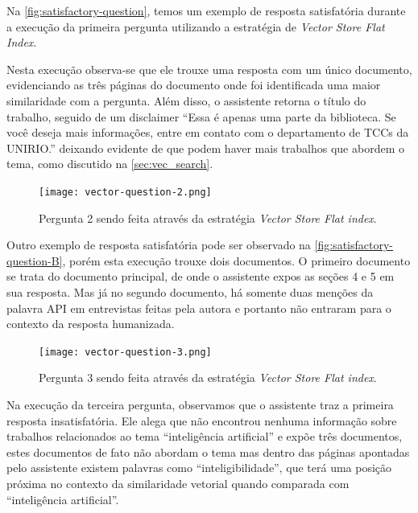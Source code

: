 \documentclass[a4paper, 12pt]{article}
\begin{document}
    Na \autoref{fig:satisfactory-question}, temos um exemplo de resposta satisfatória durante a execução da primeira pergunta utilizando a estratégia de \textit{Vector Store Flat Index}.
    
    Nesta execução observa-se que ele trouxe uma resposta com um único documento, evidenciando as três páginas do documento onde foi identificada uma maior similaridade com a pergunta. Além disso, o assistente retorna o título do trabalho, seguido de um disclaimer ``Essa é apenas uma parte da biblioteca. Se você deseja mais informações, entre em contato com o departamento de TCCs da UNIRIO.'' deixando evidente de que podem haver mais trabalhos que abordem o tema, como discutido na \autoref{sec:vec_search}.

    \begin{figure}[ht]
        \texttt{[image: vector-question-2.png]}
        \centering
        \caption{Pergunta 2 sendo feita através da estratégia \textit{Vector Store Flat index}.}
        \centering
        \label{fig:satisfactory-question-B}
    \end{figure}

    Outro exemplo de resposta satisfatória pode ser observado na \autoref{fig:satisfactory-question-B}, porém esta execução trouxe dois documentos. O primeiro documento se trata do documento principal, de onde o assistente expos as seções 4 e 5 em sua resposta. Mas já no segundo documento, há somente duas menções da palavra API em entrevistas feitas pela autora e portanto não entraram para o contexto da resposta humanizada.

    \begin{figure}[ht]
        \texttt{[image: vector-question-3.png]}
        \centering
        \caption{Pergunta 3 sendo feita através da estratégia \textit{Vector Store Flat index}.}
        \centering
        \label{fig:insatisfactory-question}
    \end{figure}

    Na execução da terceira pergunta, observamos que o assistente traz a primeira resposta insatisfatória. Ele alega que não encontrou nenhuma informação sobre trabalhos relacionados ao tema ``inteligência artificial'' e expõe três documentos, estes documentos de fato não abordam o tema mas dentro das páginas apontadas pelo assistente existem palavras como ``inteligibilidade'', que terá uma posição próxima no contexto da similaridade vetorial quando comparada com ``inteligência artificial''.

    \clearpage
    
\end{document}
